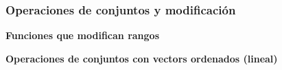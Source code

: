 \subsubsection{Operaciones de conjuntos y modificación}
    \textbf{Funciones que modifican rangos}
    

    \textbf{Operaciones de conjuntos con vectors ordenados (lineal)}
    
    